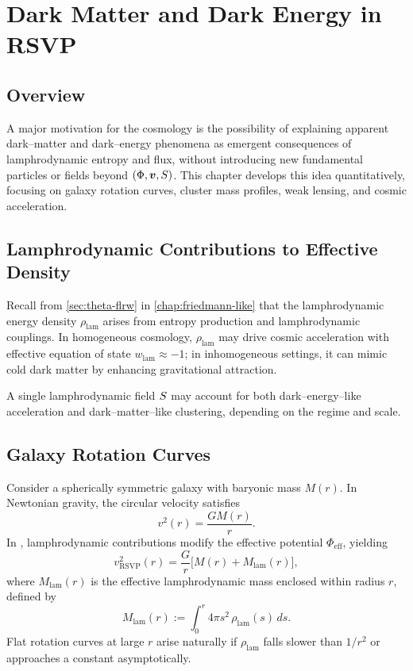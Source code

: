 
\chapter{Dark Matter and Dark Energy in RSVP}
\label{chap:dark-sector}

\section{Overview}

A major motivation for the \rsvpabbr{} cosmology is the possibility of
explaining apparent dark--matter and dark--energy phenomena as emergent
consequences of lamphrodynamic entropy and flux, without introducing
new fundamental particles or fields beyond $(\Phi,\bm{v},S)$.
This chapter develops this idea quantitatively, focusing on galaxy rotation
curves, cluster mass profiles, weak lensing, and cosmic acceleration.

\section{Lamphrodynamic Contributions to Effective Density}

Recall from \cref{sec:theta-flrw} in \cref{chap:friedmann-like} that the
lamphrodynamic energy density $\rho_{\mathrm{lam}}$ arises from
entropy production and lamphrodynamic couplings. In homogeneous
cosmology, $\rho_{\mathrm{lam}}$ may drive cosmic acceleration with
effective equation of state $w_{\mathrm{lam}}\approx -1$; in
inhomogeneous settings, it can mimic cold dark matter by enhancing
gravitational attraction.

\begin{remark}
A single lamphrodynamic field $S$ may account for both
dark--energy–like acceleration and dark--matter–like clustering,
depending on the regime and scale.
\end{remark}

\section{Galaxy Rotation Curves}

Consider a spherically symmetric galaxy with baryonic mass $M(r)$.
In Newtonian gravity, the circular velocity satisfies
\[
  v^2(r) = \frac{GM(r)}{r}.
\]
In \rsvpabbr{}, lamphrodynamic contributions modify the effective potential
$\Phi_{\mathrm{eff}}$, yielding
\[
  v^2_{\mathrm{RSVP}}(r)
  = \frac{G}{r}\bigl[M(r) + M_{\mathrm{lam}}(r)\bigr],
\]
where $M_{\mathrm{lam}}(r)$ is the effective lamphrodynamic mass enclosed
within radius $r$, defined by
\[
  M_{\mathrm{lam}}(r)
  := \int_0^r 4\pi s^2\,\rho_{\mathrm{lam}}(s)\,ds.
\]
Flat rotation curves at large $r$ arise naturally if $\rho_{\mathrm{lam}}$
falls slower than $1/r^2$ or approaches a constant asymptotically.

